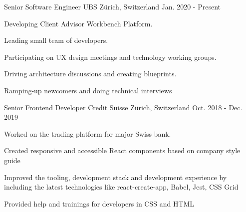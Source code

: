 

\begin{cventries}

  \cventry
    {Senior Software Engineer} %
    {UBS} %
    {Zürich, Switzerland} %
    {Jan. 2020 - Present} %
    {
      \begin{cvitems} %
        \item {Developing Client Advisor Workbench Platform.}
        \item {Leading small team of developers.}
        \item {Participating on UX design meetings and technology working groups.}
        \item {Driving architecture discussions and creating blueprints.}
        \item {Ramping-up newcomers and doing technical interviews}
      \end{cvitems}
    }

  \cventry
    {Senior Frontend Developer} %
    {Credit Suisse} %
    {Zürich, Switzerland} %
    {Oct. 2018 - Dec. 2019} %
    {
      \begin{cvitems} %
        \item {Worked on the trading platform for major Swiss bank.}
        \item {Created responsive and accessible React components based on company style guide}
        \item {Improved the tooling, development stack and development experience by including the latest technologies like react-create-app, Babel, Jest, CSS Grid}
        \item {Provided help and trainings for developers in CSS and HTML}
      \end{cvitems}
    }


\end{cventries}
